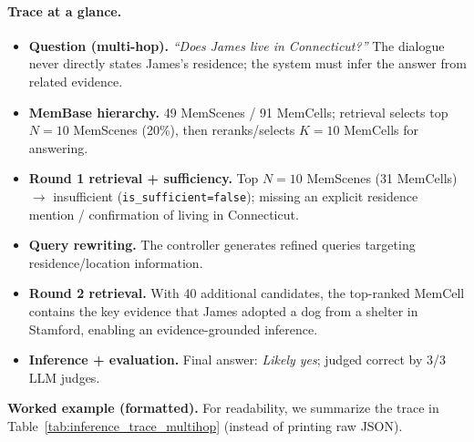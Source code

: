 \paragraph{Trace at a glance.}
\begin{itemize}
\item \textbf{Question (multi-hop).} \emph{``Does James live in Connecticut?''} The dialogue never directly states James's residence; the system must infer the answer from related evidence.
\item \textbf{MemBase hierarchy.} 49 MemScenes / 91 MemCells; retrieval selects top \(N{=}10\) MemScenes (20\%), then reranks/selects \(K{=}10\) MemCells for answering.
\item \textbf{Round 1 retrieval + sufficiency.} Top \(N{=}10\) MemScenes (31 MemCells) $\rightarrow$ insufficient (\texttt{is\_sufficient=false}); missing an explicit residence mention / confirmation of living in Connecticut.
\item \textbf{Query rewriting.} The controller generates refined queries targeting residence/location information.
\item \textbf{Round 2 retrieval.} With 40 additional candidates, the top-ranked MemCell contains the key evidence that James adopted a dog from a shelter in Stamford, enabling an evidence-grounded inference.
\item \textbf{Inference + evaluation.} Final answer: \emph{Likely yes}; judged correct by 3/3 LLM judges.
\end{itemize}

\noindent\textbf{Worked example (formatted).} For readability, we summarize the trace in Table~\ref{tab:inference_trace_multihop} (instead of printing raw JSON).

